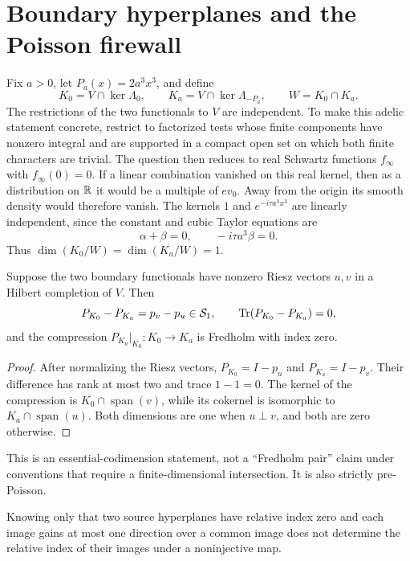 \section{Boundary hyperplanes and the Poisson firewall}

Fix \(a>0\), let \(P_a(x)=2a^3x^3\), and define
\[
  K_0=V\cap\ker\Lambda_0,
  \qquad K_a=V\cap\ker\Lambda_{-P_a},
  \qquad W=K_0\cap K_a.
\]
The restrictions of the two functionals to \(V\) are independent.  To make
this adelic statement concrete, restrict to factorized tests whose finite
components have nonzero integral and are supported in a compact open set
on which both finite characters are trivial.  The question then reduces to
real Schwartz functions \(f_\infty\) with \(f_\infty(0)=0\).  If a linear
combination vanished on this real kernel, then as a distribution on
\(\mathbb{R}\) it would be a multiple of \(ev_0\).  Away from the origin its smooth
density would therefore vanish.  The kernels \(1\) and
\(e^{-i\tau a^3x^3}\) are linearly independent, since the constant and
cubic Taylor equations are
\[
  \alpha+\beta=0,
  \qquad -i\tau a^3\beta=0.
\]
Thus \(\dim(K_0/W)=\dim(K_a/W)=1\).

\begin{proposition}\label{prop:index}
Suppose the two boundary functionals have nonzero Riesz vectors \(u,v\)
in a Hilbert completion of \(V\).  Then
\[
  P_{K_0}-P_{K_a}=p_v-p_u\in\mathcal S_1,
  \qquad
  \operatorname{Tr}(P_{K_0}-P_{K_a})=0,
\]
and the compression \(P_{K_a}|_{K_0}:K_0\to K_a\) is Fredholm with index
zero.
\end{proposition}

\begin{proof}
After normalizing the Riesz vectors,
\(P_{K_0}=I-p_u\) and \(P_{K_a}=I-p_v\).  Their difference has rank at
most two and trace \(1-1=0\).  The kernel of the compression is
\(K_0\cap\operatorname{span}(v)\), while its cokernel is isomorphic to
\(K_a\cap\operatorname{span}(u)\).  Both dimensions are one when
\(u\perp v\), and both are zero otherwise.
\end{proof}

This is an essential-codimension statement, not a ``Fredholm pair'' claim
under conventions that require a finite-dimensional intersection.  It is
also strictly pre-Poisson.

\begin{proposition}\label{prop:firewall}
Knowing only that two source hyperplanes have relative index zero and each
image gains at most one direction over a common image does not determine
the relative index of their images under a noninjective map.
\end{proposition}


